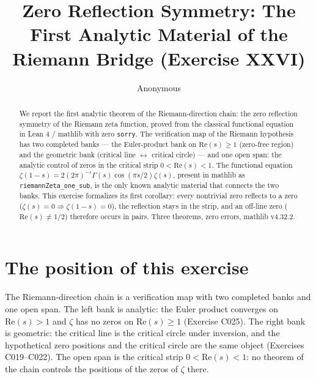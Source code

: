 \documentclass[sigplan,10pt,anonymous,review]{acmart}
\begin{document}
\title{Zero Reflection Symmetry: The First Analytic Material of the
Riemann Bridge (Exercise XXVI)}

\author{Anonymous}

\begin{abstract}
We report the first analytic theorem of the Riemann-direction chain: the
zero reflection symmetry of the Riemann zeta function, proved from the
classical functional equation in Lean 4 / mathlib with zero
\texttt{sorry}. The verification map of the Riemann hypothesis has two
completed banks --- the Euler-product bank on $\mathrm{Re}(s) \ge 1$
(zero-free region) and the geometric bank (critical line $\leftrightarrow$
critical circle) --- and one open span: the analytic control of zeros in
the critical strip $0 < \mathrm{Re}(s) < 1$. The functional equation
$\zeta(1-s) = 2(2\pi)^{-s}\Gamma(s)\cos(\pi s/2)\zeta(s)$, present in
mathlib as \texttt{riemannZeta\_one\_sub}, is the only known analytic
material that connects the two banks. This exercise formalizes its first
corollary: every nontrivial zero reflects to a zero
($\zeta(s) = 0 \Rightarrow \zeta(1-s) = 0$), the reflection stays in the
strip, and an off-line zero ($\mathrm{Re}(s) \ne 1/2$) therefore occurs
in pairs. Three theorems, zero errors, mathlib v4.32.2.
\end{abstract}


\maketitle

\section{The position of this exercise}

The Riemann-direction chain is a verification map with two completed
banks and one open span. The left bank is analytic: the Euler product
converges on $\mathrm{Re}(s) > 1$ and $\zeta$ has no zeros on
$\mathrm{Re}(s) \ge 1$ (Exercise C025). The right bank is geometric:
the critical line is the critical circle under inversion, and the
hypothetical zero positions and the critical circle are the same object
(Exercises C019--C022). The open span is the critical strip
$0 < \mathrm{Re}(s) < 1$: no theorem of the chain controls the positions
of the zeros of $\zeta$ there.
\end{document}
